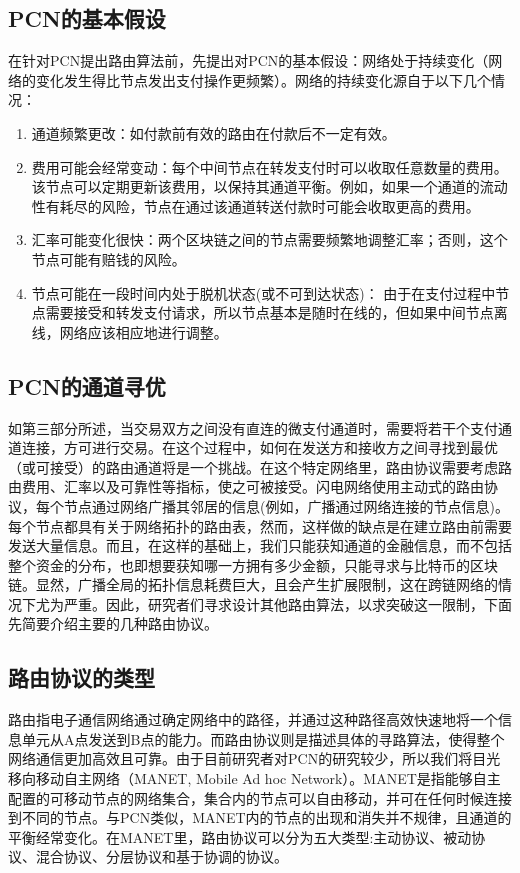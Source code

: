 \documentclass[12pt,a4paper]{article}
\begin{document}
\subsection{PCN的基本假设}
在针对PCN提出路由算法前，先提出对PCN的基本假设：网络处于持续变化（网络的变化发生得比节点发出支付操作更频繁）。网络的持续变化源自于以下几个情况：
\begin{enumerate}
	\item 通道频繁更改：如付款前有效的路由在付款后不一定有效。
	\item 费用可能会经常变动：每个中间节点在转发支付时可以收取任意数量的费用。该节点可以定期更新该费用，以保持其通道平衡。例如，如果一个通道的流动性有耗尽的风险，节点在通过该通道转送付款时可能会收取更高的费用。
	\item 汇率可能变化很快：两个区块链之间的节点需要频繁地调整汇率；否则，这个节点可能有赔钱的风险。
	\item 节点可能在一段时间内处于脱机状态(或不可到达状态)：
	由于在支付过程中节点需要接受和转发支付请求，所以节点基本是随时在线的，但如果中间节点离线，网络应该相应地进行调整。
\end{enumerate}

\subsection{PCN的通道寻优}
如第三部分所述，当交易双方之间没有直连的微支付通道时，需要将若干个支付通道连接，方可进行交易。在这个过程中，如何在发送方和接收方之间寻找到最优（或可接受）的路由通道将是一个挑战。在这个特定网络里，路由协议需要考虑路由费用、汇率以及可靠性等指标，使之可被接受。闪电网络使用主动式的路由协议，每个节点通过网络广播其邻居的信息(例如，广播通过网络连接的节点信息)。每个节点都具有关于网络拓扑的路由表，然而，这样做的缺点是在建立路由前需要发送大量信息。而且，在这样的基础上，我们只能获知通道的金融信息，而不包括整个资金的分布，也即想要获知哪一方拥有多少金额，只能寻求与比特币的区块链。显然，广播全局的拓扑信息耗费巨大，且会产生扩展限制，这在跨链网络的情况下尤为严重。因此，研究者们寻求设计其他路由算法，以求突破这一限制，下面先简要介绍主要的几种路由协议。

\subsection{路由协议的类型}
路由指电子通信网络通过确定网络中的路径，并通过这种路径高效快速地将一个信息单元从A点发送到B点的能力\cite{medhi2017network}。而路由协议则是描述具体的寻路算法，使得整个网络通信更加高效且可靠。由于目前研究者对PCN的研究较少，所以我们将目光移向移动自主网络（MANET, Mobile Ad hoc Network）。MANET是指能够自主配置的可移动节点的网络集合，集合内的节点可以自由移动，并可在任何时候连接到不同的节点。与PCN类似，MANET内的节点的出现和消失并不规律，且通道的平衡经常变化。在MANET里，路由协议可以分为五大类型:主动协议、被动协议、混合协议、分层协议和基于协调的协议。
\end{document}

